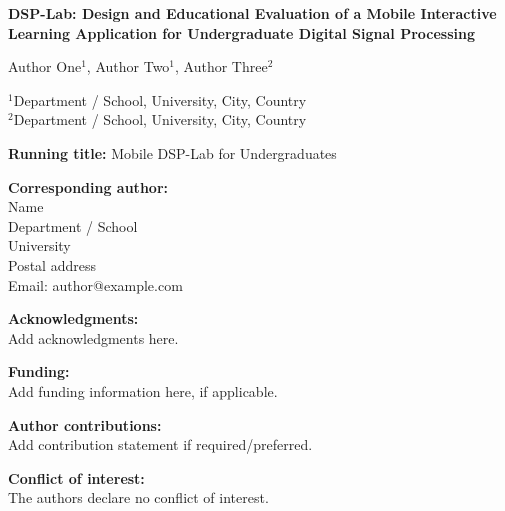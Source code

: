 \documentclass[11pt,a4paper]{article}
\begin{document}
\begin{center}
{\Large\bfseries DSP-Lab: Design and Educational Evaluation of a Mobile Interactive Learning Application for Undergraduate Digital Signal Processing\par}
\vspace{1.5em}

{\large Author One$^{1}$, Author Two$^{1}$, Author Three$^{2}$\par}
\vspace{1em}

$^{1}$Department / School, University, City, Country\\
$^{2}$Department / School, University, City, Country
\end{center}

\vspace{2em}

\noindent\textbf{Running title:} Mobile DSP-Lab for Undergraduates

\vspace{1em}

\noindent\textbf{Corresponding author:}\\
Name\\
Department / School\\
University\\
Postal address\\
Email: author@example.com

\vspace{1em}

\noindent\textbf{Acknowledgments:}\\
Add acknowledgments here.

\vspace{1em}

\noindent\textbf{Funding:}\\
Add funding information here, if applicable.

\vspace{1em}

\noindent\textbf{Author contributions:}\\
Add contribution statement if required/preferred.

\vspace{1em}

\noindent\textbf{Conflict of interest:}\\
The authors declare no conflict of interest.
\end{document}
